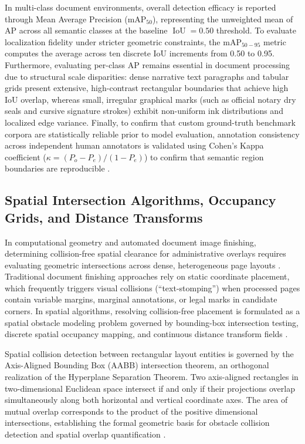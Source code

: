 In multi-class document environments, overall detection efficacy is reported through Mean Average Precision ($\mathrm{mAP}_{50}$), representing the unweighted mean of AP across all semantic classes at the baseline $\operatorname{IoU} = 0.50$ threshold.
To evaluate localization fidelity under stricter geometric constraints, the $\mathrm{mAP}_{50-95}$ metric computes the average across ten discrete IoU increments from 0.50 to 0.95.
Furthermore, evaluating per-class AP remains essential in document processing due to structural scale disparities: dense narrative text paragraphs and tabular grids present extensive, high-contrast rectangular boundaries that achieve high IoU overlap, whereas small, irregular graphical marks (such as official notary dry seals and cursive signature strokes) exhibit non-uniform ink distributions and localized edge variance.
Finally, to confirm that custom ground-truth benchmark corpora are statistically reliable prior to model evaluation, annotation consistency across independent human annotators is validated using Cohen's Kappa coefficient ($\kappa = (P_o-P_e)/(1-P_e)$) to confirm that semantic region boundaries are reproducible \cite{docxa2}.

\subsection{Spatial Intersection Algorithms, Occupancy Grids, and Distance Transforms}
\label{sec:spatial_clearance_theory}

In computational geometry and automated document image finishing, determining collision-free spatial clearance for administrative overlays requires evaluating geometric intersections across dense, heterogeneous page layouts \cite{ref34, ref35}.
Traditional document finishing approaches rely on static coordinate placement, which frequently triggers visual collisions (``text-stomping'') when processed pages contain variable margins, marginal annotations, or legal marks in candidate corners.
In spatial algorithms, resolving collision-free placement is formulated as a spatial obstacle modeling problem governed by bounding-box intersection testing, discrete spatial occupancy mapping, and continuous distance transform fields \cite{ref34, ref35}.

Spatial collision detection between rectangular layout entities is governed by the Axis-Aligned Bounding Box (AABB) intersection theorem, an orthogonal realization of the Hyperplane Separation Theorem.
Two axis-aligned rectangles in two-dimensional Euclidean space intersect if and only if their projections overlap simultaneously along both horizontal and vertical coordinate axes.
The area of mutual overlap corresponds to the product of the positive dimensional intersections, establishing the formal geometric basis for obstacle collision detection and spatial overlap quantification \cite{docxa1}.

